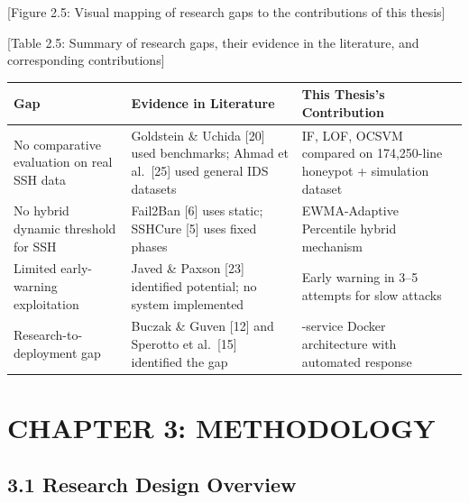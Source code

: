 \documentclass[
  a4paper]{report}
\newcounter{none} %
\begin{document}
{[}Figure 2.5: Visual mapping of research gaps to the contributions of
this thesis{]}

{[}Table 2.5: Summary of research gaps, their evidence in the
literature, and corresponding contributions{]}

{\def\LTcaptype{none} %
\begin{longtable}[]{@{}
  >{\raggedright\arraybackslash}p{}
  >{\raggedright\arraybackslash}p{}
  >{\raggedright\arraybackslash}p{}@{}}
\toprule\noalign{}
\begin{minipage}[b]{\linewidth}\raggedright
Gap
\end{minipage} & \begin{minipage}[b]{\linewidth}\raggedright
Evidence in Literature
\end{minipage} & \begin{minipage}[b]{\linewidth}\raggedright
This Thesis's Contribution
\end{minipage} \\
\midrule\noalign{}
\endhead
\bottomrule\noalign{}
\endlastfoot
No comparative evaluation on real SSH data & Goldstein \& Uchida
{[}20{]} used benchmarks; Ahmad et al.~{[}25{]} used general IDS
datasets & IF, LOF, OCSVM compared on 174,250-line honeypot + simulation
dataset \\
No hybrid dynamic threshold for SSH & Fail2Ban {[}6{]} uses static;
SSHCure {[}5{]} uses fixed phases & EWMA-Adaptive Percentile hybrid
mechanism \\
Limited early-warning exploitation & Javed \& Paxson {[}23{]} identified
potential; no system implemented & Early warning in 3--5 attempts for
slow attacks \\
Research-to-deployment gap & Buczak \& Guven {[}12{]} and Sperotto et
al.~{[}15{]} identified the gap & 9-service Docker architecture with
automated response \\
\end{longtable}
}

\chapter{CHAPTER 3: METHODOLOGY}\label{chapter-3-methodology}

\section{3.1 Research Design Overview}\label{research-design-overview}
\end{document}
